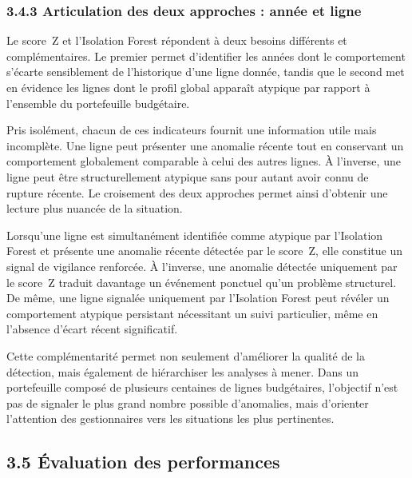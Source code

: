 \subsubsection*{3.4.3 \quad Articulation des deux approches : ann\'ee et ligne}

Le score~Z et l'Isolation Forest r\'epondent \`a deux besoins diff\'erents et
compl\'ementaires. Le premier permet d'identifier les ann\'ees dont le
comportement s'\'ecarte sensiblement de l'historique d'une ligne donn\'ee,
tandis que le second met en \'evidence les lignes dont le profil global
appara\^it atypique par rapport \`a l'ensemble du portefeuille budg\'etaire.

Pris isol\'ement, chacun de ces indicateurs fournit une information utile
mais incompl\`ete. Une ligne peut pr\'esenter une anomalie r\'ecente tout en
conservant un comportement globalement comparable \`a celui des autres lignes.
\`A l'inverse, une ligne peut \^etre structurellement atypique sans pour
autant avoir connu de rupture r\'ecente. Le croisement des deux approches
permet ainsi d'obtenir une lecture plus nuanc\'ee de la situation.

Lorsqu'une ligne est simultan\'ement identifi\'ee comme atypique par
l'Isolation Forest et pr\'esente une anomalie r\'ecente d\'etect\'ee par le
score~Z, elle constitue un signal de vigilance renforc\'ee. \`A l'inverse,
une anomalie d\'etect\'ee uniquement par le score~Z traduit davantage un
\'ev\'enement ponctuel qu'un probl\`eme structurel. De m\^eme, une ligne
signal\'ee uniquement par l'Isolation Forest peut r\'ev\'eler un comportement
atypique persistant n\'ecessitant un suivi particulier, m\^eme en l'absence
d'\'ecart r\'ecent significatif.

Cette compl\'ementarit\'e permet non seulement d'am\'eliorer la qualit\'e de
la d\'etection, mais \'egalement de hi\'erarchiser les analyses \`a mener.
Dans un portefeuille compos\'e de plusieurs centaines de lignes
budg\'etaires, l'objectif n'est pas de signaler le plus grand nombre possible
d'anomalies, mais d'orienter l'attention des gestionnaires vers les
situations les plus pertinentes.

\subsection*{3.5 \quad \'Evaluation des performances}

